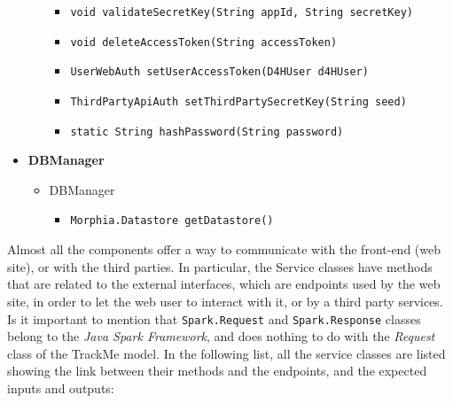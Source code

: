 \documentclass[a4paper, hidelinks, 12pt]{report}
\begin{document}
\begin{itemize}
\begin{itemize}
\begin{itemize}
						\item{\verb|void validateSecretKey(String appId, String secretKey)|}
						\item{\verb|void deleteAccessToken(String accessToken)|}
						\item{\verb|UserWebAuth setUserAccessToken(D4HUser d4HUser)|}
						\item{\verb|ThirdPartyApiAuth setThirdPartySecretKey(String seed)|}
						\item{\verb|static String hashPassword(String password)|}
					\end{itemize}
			\end{itemize}
			\item{\textbf{DBManager}}
			\begin{itemize}
				\item{DBManager}
					\begin{itemize}
						\item{\verb|Morphia.Datastore getDatastore()|}
					\end{itemize}
			\end{itemize}
	\end{itemize}
	Almost all the components offer a way to communicate with the front-end (web site), or with the third parties. In particular, the Service classes have methods that are related to the external interfaces, which are endpoints used by the web site, in order to let the web user to interact with it, or by a third party services. Is it important to mention that \verb|Spark.Request| and \verb|Spark.Response| classes belong to the \textit{Java Spark Framework}, and does nothing to do with the \textit{Request} class of the TrackMe model. In the following list, all the service classes are listed showing the link between their methods and the endpoints, and the expected inputs and outputs:
\end{document}
